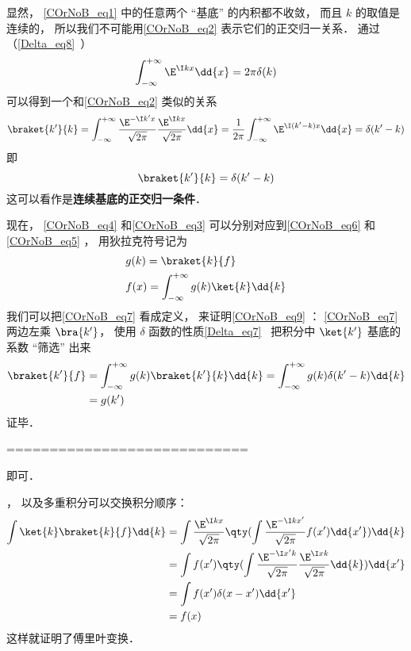 显然， \autoref{COrNoB_eq1} 中的任意两个 “基底” 的内积都不收敛， 而且 $k$ 的取值是连续的， 所以我们不可能用\autoref{COrNoB_eq2} 表示它们的正交归一关系． 通过（\autoref{Delta_eq8}~）
\begin{equation}
\int_{-\infty}^{+\infty} \E^{\I kx}\dd{x} = 2\pi \delta(k)
\end{equation}
可以得到一个和\autoref{COrNoB_eq2} 类似的关系
\begin{equation}
\braket{k'}{k} = \int_{-\infty}^{+\infty} \frac{\E^{-\I k'x}}{\sqrt{2\pi}} \frac{\E^{\I kx}}{\sqrt{2\pi}}\dd{x}
= \frac{1}{2\pi}\int_{-\infty}^{+\infty} \E^{\I (k'-k)x}\dd{x}
= \delta(k' - k)
\end{equation}
即
\begin{equation}\label{COrNoB_eq8}
\braket{k'}{k} = \delta(k' - k)
\end{equation}
这可以看作是\textbf{连续基底的正交归一条件}．

现在， \autoref{COrNoB_eq4}  和\autoref{COrNoB_eq3} 可以分别对应到\autoref{COrNoB_eq6} 和\autoref{COrNoB_eq5} ， 用狄拉克符号记为
\begin{align}\label{COrNoB_eq9}
&g(k) = \braket{k}{f}\\
\label{COrNoB_eq7}&f(x) = \int_{-\infty}^{+\infty} g(k) \ket{k} \dd{k}
\end{align}
我们可以把\autoref{COrNoB_eq7} 看成定义， 来证明\autoref{COrNoB_eq9} ： \autoref{COrNoB_eq7} 两边左乘 $\bra{k'}$， 使用 $\delta$ 函数的性质\autoref{Delta_eq7}~ 把积分中 $\ket{k'}$ 基底的系数 “筛选” 出来
\begin{equation}
\begin{aligned}
\braket{k'}{f} &= \int_{-\infty}^{+\infty} g(k) \braket{k'}{k} \dd{k} = \int_{-\infty}^{+\infty} g(k) \delta(k'-k) \dd{k}\\
&= g(k')
\end{aligned}
\end{equation}
证毕．

============================

 即可．

， 以及多重积分可以交换积分顺序：
\begin{equation}
\begin{aligned}
\int \ket{k}\braket{k}{f} \dd{k} &= \int \frac{\E^{\I kx}}{\sqrt{2\pi }} \qty(\int \frac{\E^{-\I k x'}}{\sqrt{2\pi }} f(x') \dd{x'}) \dd{k}\\
&= \int f(x') \qty(\int \frac{\E^{-\I x' k}}{\sqrt{2\pi }}\frac{\E^{\I x k}}{\sqrt{2\pi }}\dd{k}) \dd{x'}\\
&= \int f(x') \delta (x - x') \dd{x'}\\
&= f(x)
\end{aligned}
\end{equation}
这样就证明了傅里叶变换．
